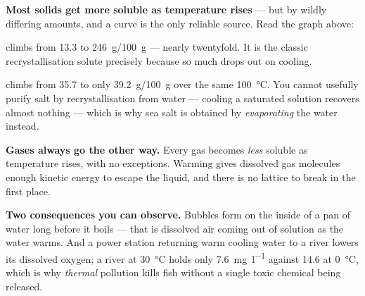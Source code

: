 \documentclass{apchem-worksheet}
\begin{document}
\begin{workedexample}
\textbf{Most solids get more soluble as temperature rises} --- but by
wildly differing amounts, and a curve is the only reliable source. Read
the graph above:

\textbf{} climbs from \SI{13.3}{} to
\SI{246}{\gram}/\SI{100}{\gram} --- nearly twentyfold. It is the classic
recrystallisation solute precisely because so much drops out on cooling.

\textbf{} climbs from \SI{35.7}{} to only
\SI{39.2}{\gram}/\SI{100}{\gram} over the same \SI{100}{\celsius}. You
cannot usefully purify salt by recrystallisation from water --- cooling
a saturated solution recovers almost nothing --- which is why sea salt
is obtained by \emph{evaporating} the water instead.

\textbf{Gases always go the other way.} Every gas becomes
\emph{less} soluble as temperature rises, with no exceptions. Warming
gives dissolved gas molecules enough kinetic energy to escape the
liquid, and there is no lattice to break in the first place.

\textbf{Two consequences you can observe.} Bubbles form on the inside of
a pan of water long before it boils --- that is dissolved air coming out
of solution as the water warms. And a power station returning warm
cooling water to a river lowers its dissolved oxygen; a river at
\SI{30}{\celsius} holds only \SI{7.6}{\milli\gram\per\litre} against
\SI{14.6}{} at \SI{0}{\celsius}, which is why \emph{thermal} pollution
kills fish without a single toxic chemical being released.
\end{workedexample}
\end{document}
